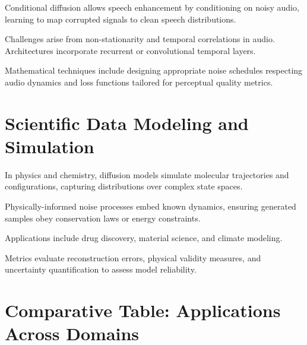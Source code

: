 Conditional diffusion allows speech enhancement by conditioning on noisy audio, learning to map corrupted signals to clean speech distributions.

Challenges arise from non-stationarity and temporal correlations in audio. Architectures incorporate recurrent or convolutional temporal layers.

Mathematical techniques include designing appropriate noise schedules respecting audio dynamics and loss functions tailored for perceptual quality metrics.

\section{Scientific Data Modeling and Simulation}

In physics and chemistry, diffusion models simulate molecular trajectories and configurations, capturing distributions over complex state spaces.

Physically-informed noise processes embed known dynamics, ensuring generated samples obey conservation laws or energy constraints.

Applications include drug discovery, material science, and climate modeling.

Metrics evaluate reconstruction errors, physical validity measures, and uncertainty quantification to assess model reliability.

\section{Comparative Table: Applications Across Domains}

\begin{table}[h]
\centering
{}
\caption{Cross-Domain Diffusion Model Applications}
\end{table}

